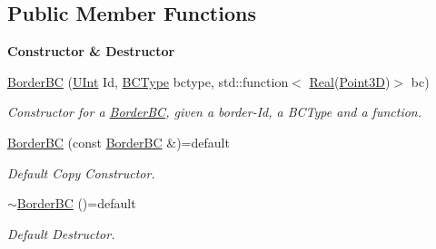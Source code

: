 \subsection*{Public Member Functions}
\begin{Indent}{\bf Constructor \& Destructor}\par
\begin{DoxyCompactItemize}
\item 
\hyperlink{classFVCode3D_1_1BoundaryConditions_1_1BorderBC_aaf34c60f11492d834ab01c12ccc51e8d}{Border\+BC} (\hyperlink{namespaceFVCode3D_a4bf7e328c75d0fd504050d040ebe9eda}{U\+Int} Id, \hyperlink{namespaceFVCode3D_a73660061f11f1671164ce171a053f8c5}{B\+C\+Type} bctype, std\+::function$<$ \hyperlink{namespaceFVCode3D_a40c1f5588a248569d80aa5f867080e83}{Real}(\hyperlink{classFVCode3D_1_1Point3D}{Point3D})$>$ bc)
\begin{DoxyCompactList}\small\item\em Constructor for a \hyperlink{classFVCode3D_1_1BoundaryConditions_1_1BorderBC}{Border\+BC}, given a border-\/\+Id, a B\+C\+Type and a function. \end{DoxyCompactList}\item 
\hyperlink{classFVCode3D_1_1BoundaryConditions_1_1BorderBC_a8c6ca485c44a192ddd4b10377ce2873d}{Border\+BC} (const \hyperlink{classFVCode3D_1_1BoundaryConditions_1_1BorderBC}{Border\+BC} \&)=default
\begin{DoxyCompactList}\small\item\em Default Copy Constructor. \end{DoxyCompactList}\item 
\hyperlink{classFVCode3D_1_1BoundaryConditions_1_1BorderBC_abc9f5438ad353ceb958d0504047b214b}{$\sim$\+Border\+BC} ()=default
\begin{DoxyCompactList}\small\item\em Default Destructor. \end{DoxyCompactList}\end{DoxyCompactItemize}
\end{Indent}
